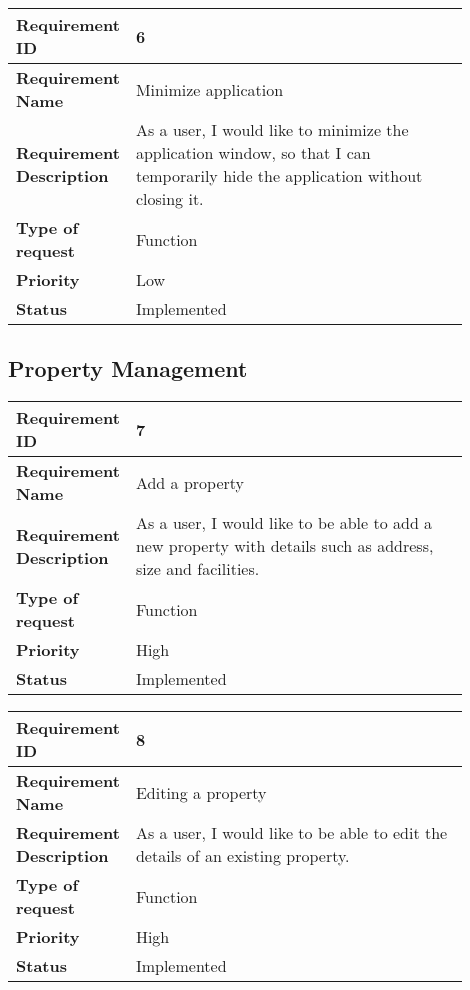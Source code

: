 \begin{table}[htbp]
\centering
\begin{tabular}{|m{0.15\linewidth}|m{0.75\linewidth}|}
\hline
\textbf{Requirement ID} & 6 \\
\hline
\textbf{Requirement Name} & Minimize application \\
\hline
\textbf{Requirement Description} & As a user, I would like to minimize the application window, so that I can temporarily hide the application without closing it. \\
\hline
\textbf{Type of request} & Function \\
\hline
\textbf{Priority} & Low \\
\hline
\textbf{Status} & Implemented \\
\hline
\end{tabular}
\end{table}

 \newpage
\subsection{Property Management}
\begin{table}[htbp]
  \centering
\begin{tabular}{|m{0.15\linewidth}|m{0.75\linewidth}|}
    \hline
    \textbf{Requirement ID} & 7 \\
    \hline
    \textbf{Requirement Name} &  Add a property \\
    \hline
    \textbf{Requirement Description} & As a user, I would like to be able to add a new property with details such as address, size and facilities. \\
    \hline
    \textbf{Type of request} & Function \\
    \hline
    \textbf{Priority} & High \\
    \hline
    \textbf{Status} & Implemented \\
    \hline
  \end{tabular}
\end{table}
  
  \begin{table}[htbp]
  \centering
\begin{tabular}{|m{0.15\linewidth}|m{0.75\linewidth}|}
    \hline
    \textbf{Requirement ID} & 8 \\
    \hline
    \textbf{Requirement Name} &  Editing a property \\
    \hline
    \textbf{Requirement Description} & As a user, I would like to be able to edit the details of an existing property. \\
    \hline
    \textbf{Type of request} & Function \\
    \hline
    \textbf{Priority} & High \\
    \hline
    \textbf{Status} & Implemented \\
    \hline
  \end{tabular}
\end{table}
  

